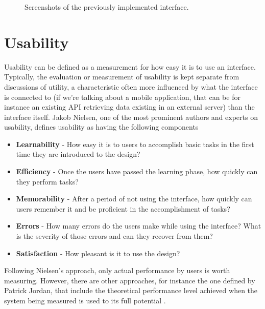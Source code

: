 \begin{figure}[h]
\begin{center}
\leavevmode
{} \hspace{1em}%
\caption{Screenshots of the previously implemented interface.}

\label{fig:current}
\end{center}
\end{figure}

\pagebreak

\section{Usability}

Usability can be defined as a measurement for how easy it is to use an interface. Typically, the evaluation or measurement of usability is kept separate from discussions of utility, a characteristic often more influenced by what the interface is connected to (if we're talking about a mobile application, that can be for instance an existing API retrieving data existing in an external server) than the interface itself. 
Jakob Nielsen, one of the most prominent authors and experts on usability, defines usability as having the following components \cite{kn: Nielsen}

\begin{itemize}
\item \textbf{Learnability} - How easy it is to users to accomplish basic tasks in the first time they are introduced to the design?
\item \textbf{Efficiency} - Once the users have passed the learning phase, how quickly can they perform tasks?
\item \textbf{Memorability} - After a period of not using the interface, how quickly can users remember it and be proficient in the accomplishment of tasks?
\item \textbf{Errors} - How many errors do the users make while using the interface? What is the severity of those errors and can they recover from them?
\item \textbf{Satisfaction} - How pleasant is it to use the design?
\end{itemize}

Following Nielsen's approach, only actual performance by users is worth measuring. However, there are other approaches, for instance the one defined by Patrick Jordan, that include the theoretical performance level achieved when the system being measured is used to its full potential \cite{kn:Jordan}.

